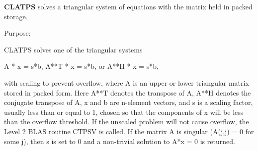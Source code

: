 {\bfseries C\+L\+A\+T\+P\+S} solves a triangular system of equations with the matrix held in packed storage. 

 \begin{DoxyParagraph}{Purpose\+: }
\begin{DoxyVerb} CLATPS solves one of the triangular systems

    A * x = s*b,  A**T * x = s*b,  or  A**H * x = s*b,

 with scaling to prevent overflow, where A is an upper or lower
 triangular matrix stored in packed form.  Here A**T denotes the
 transpose of A, A**H denotes the conjugate transpose of A, x and b
 are n-element vectors, and s is a scaling factor, usually less than
 or equal to 1, chosen so that the components of x will be less than
 the overflow threshold.  If the unscaled problem will not cause
 overflow, the Level 2 BLAS routine CTPSV is called. If the matrix A
 is singular (A(j,j) = 0 for some j), then s is set to 0 and a
 non-trivial solution to A*x = 0 is returned.\end{DoxyVerb}
 
\end{DoxyParagraph}

